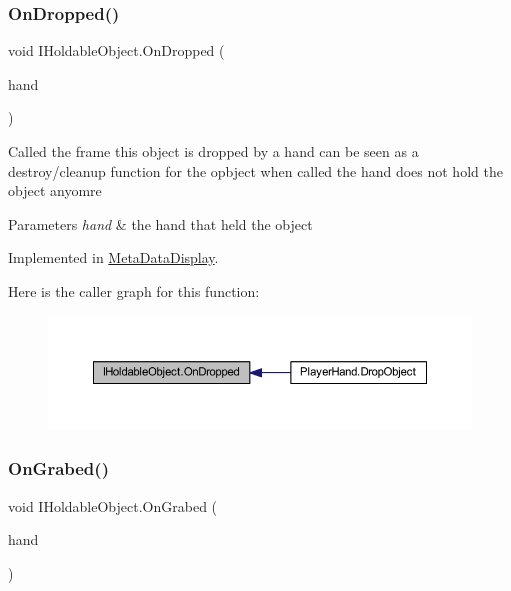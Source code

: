 \subsubsection{\texorpdfstring{On\+Dropped()}{OnDropped()}}
{\footnotesize\ttfamily void I\+Holdable\+Object.\+On\+Dropped (\begin{DoxyParamCaption}\item[{\mbox{\hyperlink{class_player_hand}{Player\+Hand}}}]{hand }\end{DoxyParamCaption})}



Called the frame this object is dropped by a hand can be seen as a destroy/cleanup function for the opbject when called the hand does not hold the object anyomre 


\begin{DoxyParams}{Parameters}
{\em hand} & the hand that held the object\\
\hline
\end{DoxyParams}


Implemented in \mbox{\hyperlink{class_meta_data_display_a274478924e6a4df19484a469ae2869ce}{Meta\+Data\+Display}}.

Here is the caller graph for this function\+:\nopagebreak
\begin{figure}[H]
\begin{center}
\leavevmode
\includegraphics[width=350pt]{interface_i_holdable_object_a19523673c41505d8533aa50b957e95a1_icgraph}
\end{center}
\end{figure}
\mbox{\label{interface_i_holdable_object_a7b8a42a0c12a26b1668c4dd904f38355}} 
\subsubsection{\texorpdfstring{On\+Grabed()}{OnGrabed()}}
{\footnotesize\ttfamily void I\+Holdable\+Object.\+On\+Grabed (\begin{DoxyParamCaption}\item[{\mbox{\hyperlink{class_player_hand}{Player\+Hand}}}]{hand }\end{DoxyParamCaption})}



